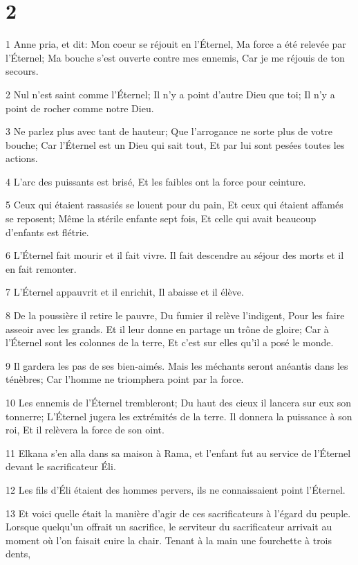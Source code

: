 \chapter{2}

\par 1 Anne pria, et dit: Mon coeur se réjouit en l'Éternel, Ma force a été relevée par l'Éternel; Ma bouche s'est ouverte contre mes ennemis, Car je me réjouis de ton secours.
\par 2 Nul n'est saint comme l'Éternel; Il n'y a point d'autre Dieu que toi; Il n'y a point de rocher comme notre Dieu.
\par 3 Ne parlez plus avec tant de hauteur; Que l'arrogance ne sorte plus de votre bouche; Car l'Éternel est un Dieu qui sait tout, Et par lui sont pesées toutes les actions.
\par 4 L'arc des puissants est brisé, Et les faibles ont la force pour ceinture.
\par 5 Ceux qui étaient rassasiés se louent pour du pain, Et ceux qui étaient affamés se reposent; Même la stérile enfante sept fois, Et celle qui avait beaucoup d'enfants est flétrie.
\par 6 L'Éternel fait mourir et il fait vivre. Il fait descendre au séjour des morts et il en fait remonter.
\par 7 L'Éternel appauvrit et il enrichit, Il abaisse et il élève.
\par 8 De la poussière il retire le pauvre, Du fumier il relève l'indigent, Pour les faire asseoir avec les grands. Et il leur donne en partage un trône de gloire; Car à l'Éternel sont les colonnes de la terre, Et c'est sur elles qu'il a posé le monde.
\par 9 Il gardera les pas de ses bien-aimés. Mais les méchants seront anéantis dans les ténèbres; Car l'homme ne triomphera point par la force.
\par 10 Les ennemis de l'Éternel trembleront; Du haut des cieux il lancera sur eux son tonnerre; L'Éternel jugera les extrémités de la terre. Il donnera la puissance à son roi, Et il relèvera la force de son oint.
\par 11 Elkana s'en alla dans sa maison à Rama, et l'enfant fut au service de l'Éternel devant le sacrificateur Éli.
\par 12 Les fils d'Éli étaient des hommes pervers, ils ne connaissaient point l'Éternel.
\par 13 Et voici quelle était la manière d'agir de ces sacrificateurs à l'égard du peuple. Lorsque quelqu'un offrait un sacrifice, le serviteur du sacrificateur arrivait au moment où l'on faisait cuire la chair. Tenant à la main une fourchette à trois dents,
